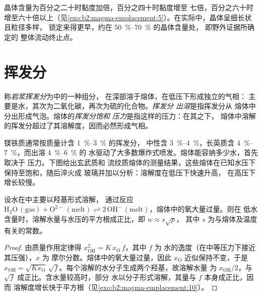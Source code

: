 晶体含量为百分之二十时黏度加倍，百分之四十时黏度增至
七倍，百分之六十时增至六十倍以上（见\cref{exo:b2:magma-emplacement:5}）。在实际中，晶体呈细长状且粒径多样，
锁定来得更早，约在 \qtyrange{50}{70}{\percent} 的晶体含量处，
即野外证据所确定的
整体流动终止点。

\section{挥发分}

\begin{definition}[岩浆挥发分]\label{def:b2:magma-emplacement:volatiles}
称\emph{岩浆挥发分}为中的一种组分，
在深部溶于熔体，在低压下形成独立的气相：
主要是水，其次为二氧化碳，再次为硫的化合物。\emph{挥发分
出溶}是指挥发分从
熔体中分出形成气泡。熔体的\emph{挥发分饱和
压力}是指这样的压力：在其之下，
熔体中溶解的挥发分超过了其溶解度，因而必然形成气相。
\end{definition}

镁铁质通常按质量计含 \qtyrange{1}{3}{\percent} 的挥发分，
中性含 \qtyrange{3}{4}{\percent}，长英质含
\qtyrange{4}{7}{\percent}，而出溶 \qtyrange{4}{6}{\percent} 的
水驱动了大多数爆炸式喷发。熔体能容纳多少水，首先取决于
压力。下图给出玄武质和
流纹质熔体的测量结果，这些熔体在已知水压下保持至饱和，随后淬火成
玻璃并加以分析：溶解度在低压下快速升高，
在高压下增长较慢。

\begin{proposition}[水的平方根定律]\label{prop:b2:magma-emplacement:sqrt}
设水在中主要以羟基形式溶解，
通过反应 $\mathrm{H_2O\,(gas)} + \mathrm{O^{2-}\,(melt)} \rightleftharpoons
2\,\mathrm{OH^-\,(melt)}$，熔体中的氧大量过量。则在
低水含量时，溶解水量与水压的平方根成正比，即
$w \approx s\sqrt{p}$，
其中 $s$ 为与熔体及温度有关的常数。
\end{proposition}

\begin{proof}
由质量作用定律得 $x_{\mathrm{OH}}^2 = K\,x_{\mathrm{O}}\,f$，其中 $f$ 为
水的逸度（在中等压力下接近其压强），$x$ 为
摩尔分数。熔体中的氧大量过量，因此
$x_{\mathrm{O}}$ 近似保持不变，于是 $x_{\mathrm{OH}} = \sqrt{Kx_{\mathrm{O}}}\,
\sqrt f$。每个溶解的水分子生成两个羟基，故溶解水量
为 $x_{\mathrm{OH}}/2$，与 $\sqrt f$ 成正比。含水量较高时，部分
水以分子形式溶解，其量与 $f$ 本身成正比，因而
溶解度增长快于平方根（见\cref{exo:b2:magma-emplacement:10}）。
\end{proof}

